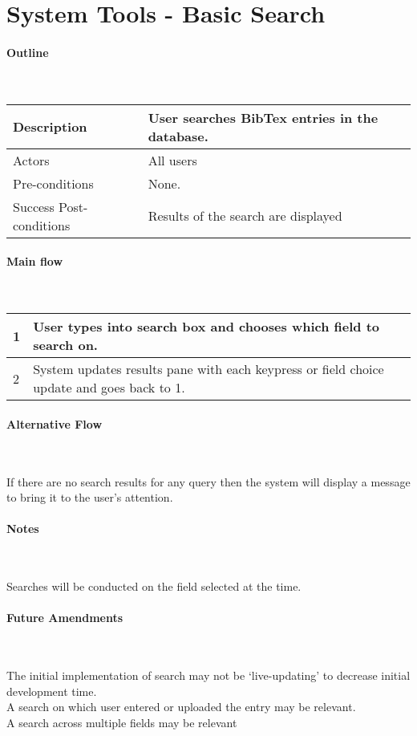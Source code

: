 \section*{System Tools - Basic Search} %

\paragraph*{Outline} \

\begin{tabular}{ | l | l | }
\hline
Description & User searches BibTex entries in the database. \\ \hline
Actors & All users \\ \hline
Pre-conditions & None. \\ \hline
Success Post-conditions & Results of the search are displayed \\ \hline
\end{tabular}


\paragraph*{Main flow} \

\begin{tabular}{ | l | l | } \hline
1 & User types into search box and chooses which field to search on. \\ \hline
2 & System updates results pane with each keypress or field choice update and goes back to 1. \\ \hline
\end{tabular}


\paragraph*{Alternative Flow} \

If there are no search results for any query then the system will display a message to bring it to the user's attention.

\paragraph*{Notes} \

Searches will be conducted on the field selected at the time.

\paragraph*{Future Amendments} \

The initial implementation of search may not be `live-updating' to decrease initial development time. \\
A search on which user entered or uploaded the entry may be relevant. \\
A search across multiple fields may be relevant

